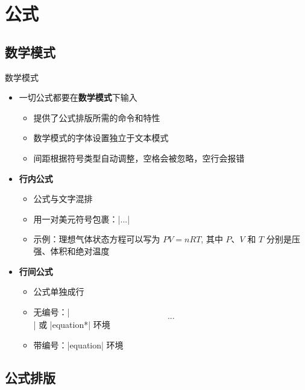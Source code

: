 \section{公式}

\subsection{数学模式}

\begin{frame}[fragile]{数学模式}
  \begin{itemize}
    \item 一切公式都要在\textbf{数学模式}下输入
          \begin{itemize}
            \item 提供了公式排版所需的命令和特性
            \item 数学模式的字体设置独立于文本模式
            \item 间距根据符号类型自动调整，空格会被忽略，空行会报错
          \end{itemize}
    \item \textbf{行内公式}
          \begin{itemize}
            \item 公式与文字混排
            \item 用一对美元符号包裹：|$...$|
            \item 示例：理想气体状态方程可以写为 $PV=nRT$, 其中 $P$、$V$ 和 $T$ 分别是压强、体积和绝对温度
          \end{itemize}
    \item \textbf{行间公式}
          \begin{itemize}
            \item 公式单独成行
            \item 无编号：|\[...\]| 或 |equation*| 环境
            \item 带编号：|equation| 环境
          \end{itemize}
  \end{itemize}
\end{frame}

\subsection{公式排版}

